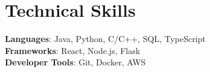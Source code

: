 \documentclass[letterpaper,11pt]{article}
\begin{document}
\section{Technical Skills}
 \begin{itemize}[leftmargin=0.15in, label={}]
    \small{\item{
     \textbf{Languages}{: Java, Python, C/C++, SQL, TypeScript} \\
     \textbf{Frameworks}{: React, Node.js, Flask} \\
     \textbf{Developer Tools}{: Git, Docker, AWS}
    }}
 \end{itemize}
\end{document}
